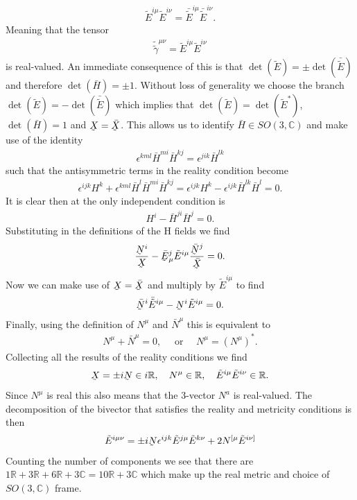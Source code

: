 \documentclass[10pt]{report}
\newcommand{\utilde}[1]{\underaccent{\tilde}{#1}}
\theoremstyle{definition}
\newcommand{\R}[0]{\mathbb{R}}
\newcommand{\C}[0]{\mathbb{C}}
\newcommand{\tE}[0]{\tilde{E}}
\newcommand{\dlap}[0]{\utilde{N}}
\newcommand{\utE}[0]{\utilde{E}}
\begin{document}
    \begin{align}
        \tE^{i\mu} \tE^{i\nu} = \bar{\tE}^{i\mu} \bar{\tE}^{i\nu}.
    \end{align}
    Meaning that the tensor
    \begin{align}
        \tilde{\tilde{\gamma}}^{\mu\nu} = \tE^{i\mu} \tE^{i\nu}
    \end{align}
    is real-valued. An immediate consequence of this is that $\det(\tE) = \pm \det(\bar{\tE})$ and therefore $\det(\bar{H}) = \pm 1$. Without loss of generality we choose the branch $\det(\tE) = -\det(\bar{\tE})$ which implies that $\det(\tE) = \det(\tE^*)$, $\det(\bar{H}) = 1$ and $\utilde{X} = \bar{\utilde{X}}$. This allows us to identify $\bar{H} \in SO(3,\C)$ and make use of the identity
    \begin{align}
        \epsilon^{kml} \bar{H}^{mi} \bar{H}^{kj}= \epsilon^{jik} \bar{H}^{lk}
    \end{align}
    such that the antisymmetric terms in the reality condition become
    \begin{align}
        \epsilon^{ijk} H^k + \epsilon^{kml} \bar{H}^l \bar{H}^{mi} \bar{H}^{kj} = \epsilon^{ijk} H^k - \epsilon^{ijk} \bar{H}^{lk} \bar{H}^l = 0.
    \end{align}
    It is clear then at the only independent condition is 
    \begin{align}
        H^i - \bar{H}^{ji} \bar{H}^j = 0.
    \end{align}
    Substituting in the definitions of the H fields we find 
    \begin{align}
        \frac{\utilde{N}^i}{\utilde{X}} - \bar{\utE}^j_\mu \tE^{i\mu} \frac{\bar{\utilde{N}}^j}{\bar{\utilde{X}}} = 0.
    \end{align}
    Now we can make use of $\utilde{X} = \bar{\utilde{X}}$ and multiply by $\tE^{i\mu}$ to find 
    \begin{align}
        \bar{\utilde{N}}^i \bar{\tE}^{i\mu} - \utilde{N}^i \tE^{i\mu} = 0.
    \end{align}
    Finally, using the definition of $N^\mu$ and $\bar{N}^\mu$ this is equivalent to 
    \begin{align}
        N^\mu + \bar{N}^\mu = 0, \quad \textrm{ or } \quad N^\mu = (N^\mu)^*.
    \end{align}
    Collecting all the results of the reality conditions we find 
    \begin{align}
        \utilde{X} = \pm i \dlap \in i \R, \quad N^\mu \in \R, \quad \tE^{i\mu} \tE^{i\nu} \in \R.
    \end{align}
    Since $N^\mu$ is real this also means that the 3-vector $N^a$ is real-valued. The decomposition of the bivector that satisfies the reality and metricity conditions is then
    \begin{align}
        \tE^{i\mu\nu} = \pm i \dlap \epsilon^{ijk} \tE^{j\mu} \tE^{k\nu} + 2 N^{[\mu} \tE^{i\nu]} \label{eq:num-plebanski-bivector-real-decomposition}
    \end{align}
    Counting the number of components we see that there are $1\R + 3\R + 6\R + 3\C = 10\R + 3\C$ which make up the real metric and choice of $SO(3,\C)$ frame.
\end{document}
